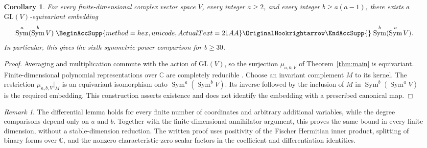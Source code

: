 \documentclass[11pt]{article}
\renewcommand{\hookrightarrow}{\mathrel{%
  \BeginAccSupp{method=hex,unicode,ActualText=21AA}%
  \OriginalHookrightarrow\EndAccSupp{}}}
\newtheorem{corollary}[theorem]{Corollary}
\theoremstyle{remark}
\newtheorem{remark}[theorem]{Remark}
\DeclareMathOperator{\Sym}{Sym}
\newcommand{\C}{\mathbb C}
\begin{document}
\begin{corollary}\label{cor:comparison}
For every finite-dimensional complex vector space $V$, every integer
$a\ge2$, and every integer $b\ge a(a-1)$, there exists a
$\mathrm{GL}(V)$-equivariant embedding
\[
 \Sym^a(\Sym^b V)\hookrightarrow\Sym^b(\Sym^a V).
\]
In particular, this gives the sixth symmetric-power comparison for $b\ge30$.
\end{corollary}

\begin{proof}
Averaging and multiplication commute with the action of $\mathrm{GL}(V)$,
so the surjection $\mu_{a,b,V}$ of Theorem~\ref{thm:main} is equivariant.
Finite-dimensional polynomial representations over $\C$ are completely
reducible \cite[Chapter~I, Appendix~A, Sections~7--8]{Macdonald}.
Choose an invariant complement $M$ to its kernel. The restriction
$\mu_{a,b,V}|_M$ is an equivariant isomorphism onto
$\Sym^a(\Sym^b V)$. Its inverse followed by the inclusion of $M$ in
$\Sym^b(\Sym^a V)$ is the required embedding. This construction asserts
existence and does not identify the embedding with a prescribed canonical map.
\end{proof}

\begin{remark}
The differential lemma holds for every finite number of coordinates and
arbitrary additional variables, while the degree comparisons depend only
on $a$ and $b$. Together with the finite-dimensional annihilator argument,
this proves the same bound in every finite dimension, without a
stable-dimension reduction. The written proof uses positivity of the
Fischer Hermitian inner product, splitting of binary forms over $\C$, and
the nonzero characteristic-zero scalar factors in the coefficient and
differentiation identities.
\end{remark}


\end{document}
